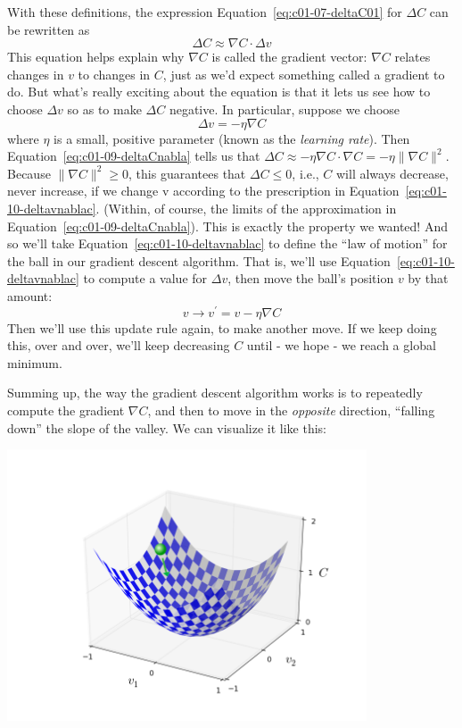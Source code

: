 With these definitions, the expression Equation~\ref{eq:c01-07-deltaC01} for $\Delta C$ can be rewritten as 
\begin{equation}
\Delta C \approx \nabla C \cdot \Delta v
\label{eq:c01-09-deltaCnabla}
\end{equation}
This equation helps explain why $\nabla C$ is called the gradient vector: $\nabla C$ relates changes in $v$ to changes in $C$, just as we'd expect something called a gradient to do. But what's really exciting about the equation is that it lets us see how to choose $\Delta v$ so as to make $\Delta C$ negative. In particular, suppose we choose 
\begin{equation}
\Delta v=-\eta \nabla C
\label{eq:c01-10-deltavnablac}
\end{equation}
where $\eta$ is a small, positive parameter (known as the \textit{learning rate}). Then Equation~\ref{eq:c01-09-deltaCnabla} tells us that $\Delta C \approx-\eta \nabla C \cdot \nabla C=-\eta\parallel\nabla C\parallel^{2}$. Because $\parallel\nabla C\parallel^{2} \geq 0$, this guarantees that $\Delta C\leq 0$, i.e., $C$ will always decrease, never increase, if we change v according to the prescription in Equation~\ref{eq:c01-10-deltavnablac}. (Within, of course, the limits of the approximation in Equation~\ref{eq:c01-09-deltaCnabla}). This is exactly the property we wanted! And so we'll take Equation~\ref{eq:c01-10-deltavnablac} to define the ``law of motion'' for the ball in our gradient descent algorithm. That is, we'll use Equation~\ref{eq:c01-10-deltavnablac} to compute a value for $\Delta v$, then move the ball's position $v$ by that amount: 
\begin{equation}
v \rightarrow v^{\prime}=v-\eta \nabla C
\end{equation}
Then we'll use this update rule again, to make another move. If we keep doing this, over and over, we'll keep decreasing $C$ until - we hope - we reach a global minimum.

Summing up, the way the gradient descent algorithm works is to repeatedly compute the gradient $\nabla C$, and then to move in the \textit{opposite} direction, ``falling down'' the slope of the valley. We can visualize it like this:

{\centering
\includegraphics[width=0.8\textwidth,]{pic/valley_with_ball}
\par}

